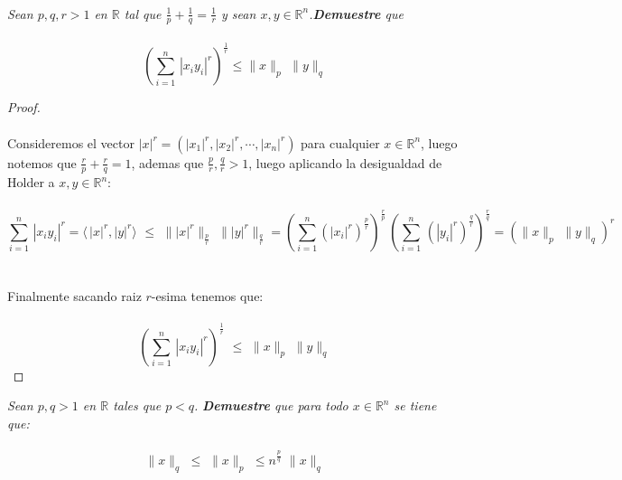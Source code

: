 \documentclass[11pt,letterpaper]{article}
\newcommand{\R}{\mathbb{R}}
\begin{document}
\,\\
\begin{tcolorbox}[
	title = \textcolor{black}{\textcolor{white}{Problema 1}}]
\textit{Sean $p,q,r>1$ en $\R$ tal que $\frac{1}{p}+\frac{1}{q}=\frac{1}{r}$ y sean $x,y\in \R^n$.\textbf{Demuestre} que\,\\
\,\\
\begin{equation*}
    \left(\sum_{i=1}^n\,|x_iy_i|^r\right)^{\frac{1}{r}}\leq \parallel x \parallel_{p}\,\,\parallel y \parallel_{q}
\end{equation*}
}
\end{tcolorbox}
\begin{proof}\,\\
    \,\\
    Consideremos el vector $|x|^r=(|x_1|^r,|x_2|^r,\cdots,|x_n|^r)$  para cualquier $x\in \R^n$, luego notemos que $\frac{r}{p}+\frac{r}{q}=1$, ademas que $\frac{p}{r},\frac{q}{r}>1$, luego aplicando la desigualdad de Holder a $x,y\in \R^n$:\,\\
    \,\\
    \begin{equation*}
        \sum_{i=1}^n\,|x_iy_i|^r=\langle\,|x|^r,|y|^r\rangle\,\,\leq\,\,\| |x|^r \|_{\frac{p}{r}}\,\,\| |y|^r \|_{\frac{q}{r}}=\left(\sum_{i=1}^n (|x_i|^r)^{\frac{p}{r}}\right)^{\frac{r}{p}}\,\left(\sum_{i=1}^{n}\,(|y_i|^r)^{\frac{q}{r}}\right)^{\frac{r}{q}}=(\|x\|_{p}\,\,\|y\|_{q})^r
    \end{equation*}\,\\
    \,\\
    Finalmente sacando  raiz $r$-esima tenemos que:\,\\
    \,\\
    \begin{equation*}
        \left(\sum_{i=1}^n\,|x_iy_i|^r\right)^{\frac{1}{r}}\,\,\leq\,\,\|x\|_{p}\,\,\|y\|_{q}
    \end{equation*} 
    
\end{proof}
\newpage
\begin{tcolorbox}[
	title = \textcolor{black}{\textcolor{white}{Problema 2}}]
\textit{Sean $p,q> 1$ en $\R$ tales que $p<q$.\,\,\textbf{Demuestre} que para todo $x\in \R^n$ se tiene que:\,\\
\,\\
\begin{equation*}
    \|x\|_q\,\,\leq\,\,\|x\|_p\,\,\leq n^{\frac{p}{q}}\,\,\|x\|_q
\end{equation*}
}
\end{tcolorbox}
\end{document}
